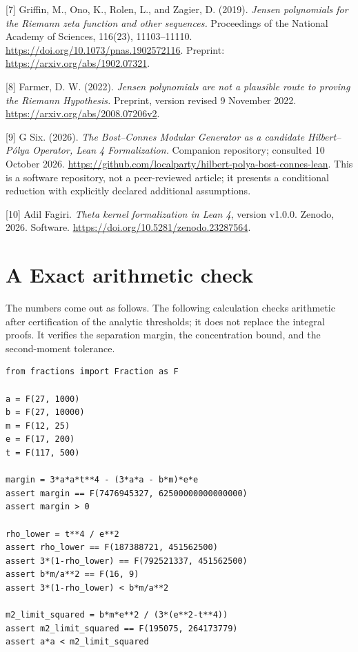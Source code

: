\documentclass[
  11pt,
]{article}
\begin{document}
{[}7{]} Griffin, M., Ono, K., Rolen, L., and Zagier, D. (2019). \emph{Jensen polynomials for the Riemann zeta function and other sequences.} Proceedings of the National Academy of Sciences, 116(23), 11103--11110. \url{https://doi.org/10.1073/pnas.1902572116}. Preprint: \url{https://arxiv.org/abs/1902.07321}.

{[}8{]} Farmer, D. W. (2022). \emph{Jensen polynomials are not a plausible route to proving the Riemann Hypothesis.} Preprint, version revised 9 November 2022. \url{https://arxiv.org/abs/2008.07206v2}.

{[}9{]} G Six. (2026). \emph{The Bost--Connes Modular Generator as a candidate Hilbert--Pólya Operator, Lean 4 Formalization.} Companion repository; consulted 10 October 2026. \url{https://github.com/localparty/hilbert-polya-bost-connes-lean}. This is a software repository, not a peer-reviewed article; it presents a conditional reduction with explicitly declared additional assumptions.

{[}10{]} Adil Fagiri. \emph{Theta kernel formalization in Lean 4}, version v1.0.0. Zenodo, 2026. Software. \url{https://doi.org/10.5281/zenodo.23287564}.

\hypertarget{a-exact-arithmetic-check}{%
\section{A Exact arithmetic check}\label{a-exact-arithmetic-check}}

The numbers come out as follows. The following calculation checks arithmetic after certification of the analytic thresholds; it does not replace the integral proofs. It verifies the separation margin, the concentration bound, and the second-moment tolerance.

\begin{verbatim}
from fractions import Fraction as F

a = F(27, 1000)
b = F(27, 10000)
m = F(12, 25)
e = F(17, 200)
t = F(117, 500)

margin = 3*a*a*t**4 - (3*a*a - b*m)*e*e
assert margin == F(7476945327, 62500000000000000)
assert margin > 0

rho_lower = t**4 / e**2
assert rho_lower == F(187388721, 451562500)
assert 3*(1-rho_lower) == F(792521337, 451562500)
assert b*m/a**2 == F(16, 9)
assert 3*(1-rho_lower) < b*m/a**2

m2_limit_squared = b*m*e**2 / (3*(e**2-t**4))
assert m2_limit_squared == F(195075, 264173779)
assert a*a < m2_limit_squared
\end{verbatim}
\end{document}

